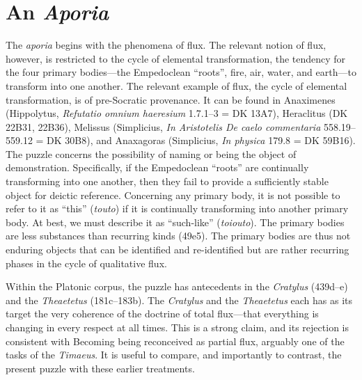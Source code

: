 
\section{An \emph{Aporia}} %
\label{sec:an_emph_aporia}

The \emph{aporia} begins with the phenomena of flux. The relevant notion of flux, however, is restricted to the cycle of elemental transformation, the tendency for the four primary bodies---the Empedoclean ``roots'', fire, air, water, and earth---to transform into one another. The relevant example of flux, the cycle of elemental transformation, is of pre-Socratic provenance. It can be found in Anaximenes (Hippolytus, \emph{Refutatio omnium haeresium} 1.7.1--3 = DK 13A7), Heraclitus (DK 22B31, 22B36), Melissus (Simplicius, \emph{In Aristotelis De caelo commentaria} 558.19--559.12 = DK 30B8), and Anaxagoras (Simplicius, \emph{In physica} 179.8 = DK 59B16). The puzzle concerns the possibility of naming or being the object of demonstration. Specifically, if the Empedoclean ``roots'' are continually transforming into one another, then they fail to provide a sufficiently stable object for deictic reference. Concerning any primary body, it is not possible to refer to it as ``this'' (\emph{touto}) if it is continually transforming into another primary body. At best, we must describe it as ``such-like'' (\emph{toiouto}). The primary bodies are less substances than recurring kinds (49e5). The primary bodies are thus not enduring objects that can be identified and re-identified but are rather recurring phases in the cycle of qualitative flux.

Within the Platonic corpus, the puzzle has antecedents in the \emph{Cratylus} (439d--e) and the \emph{Theaetetus} (181c--183b). The \emph{Cratylus} and the \emph{Theaetetus} each has as its target the very coherence of the doctrine of total flux---that everything is changing in every respect at all times. This is a strong claim, and its rejection is consistent with Becoming being reconceived as partial flux, arguably one of the tasks of the \emph{Timaeus}. It is useful to compare, and importantly to contrast, the present puzzle with these earlier treatments. 

